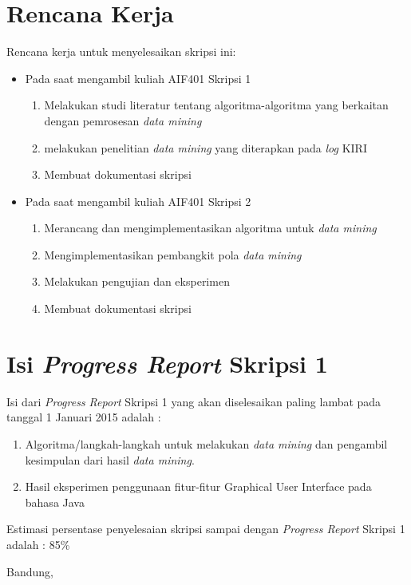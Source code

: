 \documentclass[a4paper,twoside]{article}
\begin{document}
\section{Rencana Kerja}
Rencana kerja untuk menyelesaikan skripsi ini:
\begin{itemize}
	\item Pada saat mengambil kuliah AIF401 Skripsi 1
	\begin{enumerate}
		\item Melakukan studi literatur tentang algoritma-algoritma yang berkaitan dengan pemrosesan \textsl{data mining}
		\item melakukan penelitian \textsl{data mining} yang diterapkan pada \textsl{log} KIRI
		\item Membuat dokumentasi skripsi
	\end{enumerate}
	\item Pada saat mengambil kuliah AIF401 Skripsi 2
	\begin{enumerate}
		\item Merancang dan mengimplementasikan algoritma untuk \textsl{data mining}
		\item Mengimplementasikan pembangkit pola \textsl{data mining}
		\item Melakukan pengujian dan eksperimen
		\item Membuat dokumentasi skripsi
	\end{enumerate}
\end{itemize}

\section{Isi {\it Progress Report} Skripsi 1}
Isi dari {\it Progress Report} Skripsi 1 yang akan diselesaikan paling lambat pada tanggal 1 Januari 2015 adalah :
\begin{enumerate}
	\item Algoritma/langkah-langkah untuk melakukan \textsl{data mining} dan pengambil kesimpulan dari hasil \textsl{data mining}.
	\item Hasil eksperimen penggunaan fitur-fitur Graphical User Interface pada bahasa Java
\end{enumerate}
Estimasi persentase penyelesaian skripsi sampai dengan {\it Progress Report} Skripsi 1 adalah : 85\%
\vspace{1.5cm}

\centering Bandung, \tanggal\\
\vspace{2cm} \nama \\ 
\end{document}

